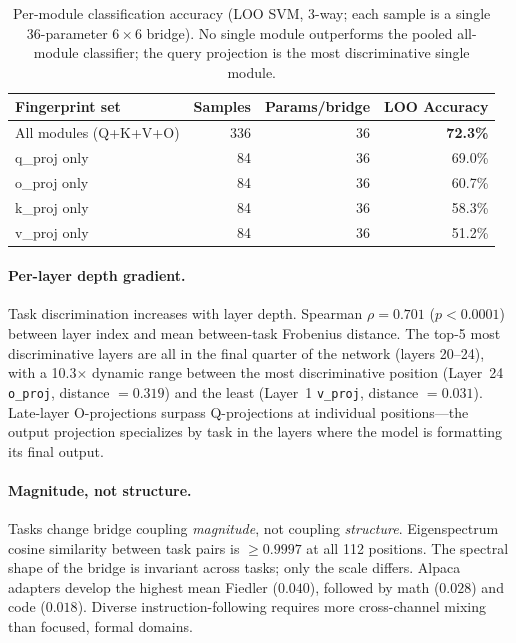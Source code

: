 \begin{table}[t]
\centering
\caption{Per-module classification accuracy (LOO SVM, 3-way; each
sample is a single 36-parameter $6 \times 6$ bridge). No single module
outperforms the pooled all-module classifier; the query projection is
the most discriminative single module.}
\label{tab:subset-class}
\small
\begin{tabular}{@{}lrrr@{}}
\toprule
Fingerprint set & Samples & Params/bridge & LOO Accuracy \\
\midrule
All modules (Q+K+V+O) & 336 & 36 & \textbf{72.3\%} \\
q\_proj only & 84 & 36 & 69.0\% \\
o\_proj only & 84 & 36 & 60.7\% \\
k\_proj only & 84 & 36 & 58.3\% \\
v\_proj only & 84 & 36 & 51.2\% \\
\bottomrule
\end{tabular}
\end{table}

\paragraph{Per-layer depth gradient.}
Task discrimination increases with layer depth. Spearman $\rho = 0.701$
($p < 0.0001$) between layer index and mean between-task Frobenius
distance. The top-5 most discriminative layers are all in the final quarter
of the network (layers 20--24), with a 10.3$\times$ dynamic range between
the most discriminative position (Layer~24 \texttt{o\_proj}, distance
$= 0.319$) and the least (Layer~1 \texttt{v\_proj}, distance $= 0.031$).
Late-layer O-projections surpass Q-projections at individual positions---the
output projection specializes by task in the layers where the model is
formatting its final output.

\paragraph{Magnitude, not structure.}
Tasks change bridge coupling \emph{magnitude}, not coupling
\emph{structure}. Eigenspectrum cosine similarity between task pairs is
$\geq 0.9997$ at all 112 positions. The spectral shape of the bridge
is invariant across tasks; only the scale differs. Alpaca adapters develop
the highest mean Fiedler ($0.040$), followed by math ($0.028$) and code
($0.018$). Diverse instruction-following requires more cross-channel
mixing than focused, formal domains.

